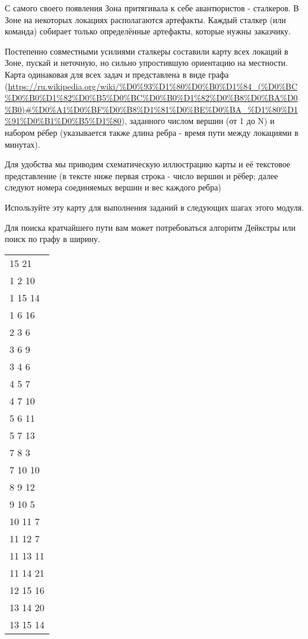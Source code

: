 
С самого своего появления Зона притягивала к себе авантюристов - сталкеров. В Зоне на некоторых локациях располагаются артефакты. Каждый сталкер (или команда) собирает только определённые артефакты, которые нужны заказчику.

Постепенно совместными усилиями сталкеры составили карту всех локаций в Зоне, пускай и неточную, 
    но сильно упростившую ориентацию на местности. Карта одинаковая для всех задач и представлена в виде графа
    (\url{https://ru.wikipedia.org/wiki/%D0%93%D1%80%D0%B0%D1%84_(%D0%BC%D0%B0%D1%82%D0%B5%D0%BC%D0%B0%D1%82%D0%B8%D0%BA%D0%B0)#%D0%A1%D0%BF%D0%B8%D1%81%D0%BE%D0%BA_%D1%80%D1%91%D0%B1%D0%B5%D1%80}), заданного числом вершин (от 1 до N) и набором рёбер (указывается также длина ребра - время пути между локациями в минутах).

Для удобства мы приводим схематическую иллюстрацию карты и её текстовое представление (в тексте ниже первая строка - число вершин и рёбер; далее следуют номера соединяемых вершин и вес каждого ребра)

Используйте эту карту для выполнения заданий в следующих шагах этого модуля.

Для поиска кратчайшего пути вам может потребоваться алгоритм Дейкстры или поиск по графу в ширину.


\begin{longtable}{l}
    15 21 \\
    1 2 10 \\
    1 15 14 \\
    1 6 16 \\ 
    2 3 6 \\
    3 6 9 \\
    3 4 6 \\
    4 5 7 \\
    4 7 10 \\
    5 6 11 \\
    5 7 13 \\
    7 8 3 \\
    7 10 10 \\
    8 9 12 \\
    9 10 5 \\
    10 11 7 \\
    11 12 7 \\
    11 13 11 \\
    11 14 21 \\
    12 15 16 \\
    13 14 20 \\
    13 15 14 \\
\end{longtable}

